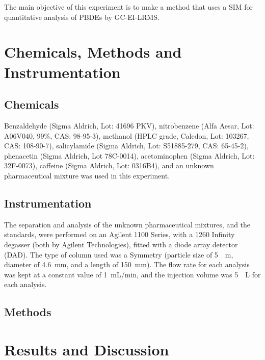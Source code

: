 \documentclass[a4paper, 12pt]{article}
\begin{document}
The main objective of this experiment is to make a method that uses a SIM for quantitative analysis of PBDEs by GC-EI-LRMS.


\section{Chemicals, Methods and Instrumentation}

\subsection{Chemicals}
Benzaldehyde (Sigma Aldrich, Lot: 41696 PKV), nitrobenzene (Alfa Aesar, Lot: A06V040, 99\%, CAS: 98-95-3), methanol (HPLC grade, Caledon, Lot: 103267, CAS: 108-90-7), salicylamide (Sigma Aldrich, Lot: S51885-279, CAS: 65-45-2), phenacetin (Sigma Aldrich, Lot 78C-0014), acetominophen (Sigma Aldrich, Lot: 32F-0073), caffeine (Sigma Aldrich, Lot: 0316B4), and an unknown pharmaceutical mixture was used in this experiment.

\subsection{Instrumentation}
The separation and analysis of the unknown pharmaceutical mixtures, and the standards, were performed on an Agilent 1100 Series, with a 1260 Infinity degasser (both by Agilent Technologies), fitted with a diode array detector (DAD). The type of column used was a Symmetry\textregistered{}  (particle size of \SI{5}{\mu{}m}, diameter of \SI{4.6}{mm}, and a length of \SI{150}{mm}). The flow rate for each analysis was kept at a constant value of \SI{1}{mL/min}, and the injection volume was \SI{5}{\mu{}L} for each analysis.

\subsection{Methods}


\section{Results and Discussion}
\end{document}
